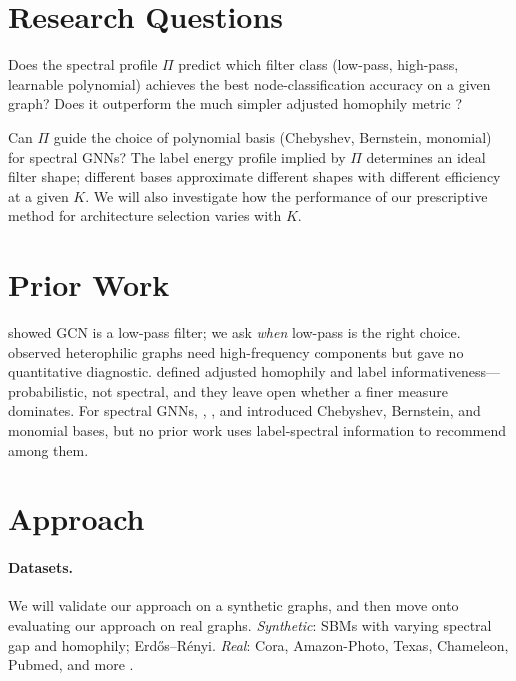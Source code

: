 \documentclass[11pt]{article}
\begin{document}
\section{Research Questions}

\begin{description}[leftmargin=0.5em, style=nextline]
  \item[RQ1: Spatial GNN selection.]
    Does the spectral profile $\Pi$ predict which filter class (low-pass, high-pass,
    learnable polynomial) achieves the best node-classification
    accuracy on a given graph? Does it outperform the much simpler adjusted homophily metric
    \citep{platonov2023characterizing}?

  \item[RQ2: Spectral GNN basis and order selection.]
    Can $\Pi$ guide the choice of polynomial basis (Chebyshev,
    Bernstein, monomial) for spectral GNNs? The label
    energy profile implied by $\Pi$ determines an ideal filter shape;
    different bases approximate different shapes with different efficiency
    at a given $K$. We will also investigate how the performance of our prescriptive method for architecture selection varies with $K$.

\end{description}

\section{Prior Work}

\citet{nt2019lowpass} showed GCN is a low-pass filter; we ask
\emph{when} low-pass is the right choice. \citet{bo2021fagcn} observed
heterophilic graphs need high-frequency components but gave no
quantitative diagnostic. \citet{platonov2023characterizing} defined adjusted
homophily and label informativeness---probabilistic, not spectral, and
they leave open whether a finer measure dominates. For spectral GNNs, \citet{defferrard2016chebnet},
\citet{he2021bernnet}, and \citet{chien2021gprgnn} introduced Chebyshev,
Bernstein, and monomial bases, but no prior work uses label-spectral
information to recommend among them.

\section{Approach}

\paragraph{Datasets.} We will validate our approach on a synthetic graphs, and then move onto evaluating our approach on real graphs.  \emph{Synthetic}: SBMs with varying spectral gap and homophily; Erd\H{o}s--R\'enyi.
\emph{Real}: Cora, Amazon-Photo, Texas, Chameleon, Pubmed, and more \citep{hu2020ogb, rozemberczki2021twitch, weber2019anti}.
\end{document}
